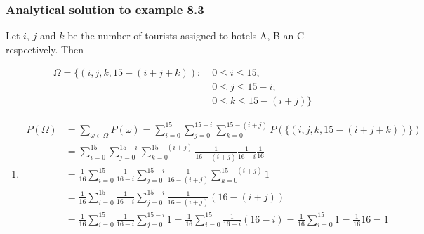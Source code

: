 \begin{frame}
    \frametitle{Analytical solution to example 8.3}

    \tiny
    Let $i$, $j$ and $k$ be the number of tourists assigned to hotels A, B an C
    respectively. Then 

    \begin{align*}
        \Omega=\{(i,j,k,15-(i+j+k)):\;&0\le i\le 15,\\
                                      &0\le j\le 15-i;\\
                                      &0\le k\le 15-(i+j)\}
    \end{align*}

    \begin{enumerate}[a]
		\conti
        \item 
            \begin{align*}
				P(\Omega)&=\sum_{\omega\in\Omega}P(\omega)=\sum_{i=0}^{15}\sum_{j=0}^{15-i}\sum_{k=0}^{15-(i+j)}P(\{(i,j,k,15-(i+j+k))\})\\
                         &=\sum_{i=0}^{15}\sum_{j=0}^{15-i}\sum_{k=0}^{15-(i+j)}\frac{1}{16-(i+j)}\frac{1}{16-i}\frac{1}{16}\\
                         &=\frac{1}{16}\sum_{i=0}^{15}\frac{1}{16-i}\sum_{j=0}^{15-i}\frac{1}{16-(i+j)}\sum_{k=0}^{15-(i+j)}1\\
                         &=\frac{1}{16}\sum_{i=0}^{15}\frac{1}{16-i}\sum_{j=0}^{15-i}\frac{1}{16-(i+j)}(16-(i+j))\\
                         &=\frac{1}{16}\sum_{i=0}^{15}\frac{1}{16-i}\sum_{j=0}^{15-i}1=\frac{1}{16}\sum_{i=0}^{15}\frac{1}{16-i}(16-i)=\frac{1}{16}\sum_{i=0}^{15}1=\frac{1}{16}16=1
            \end{align*}
		\seti
    \end{enumerate}
    \normalsize

\end{frame}

